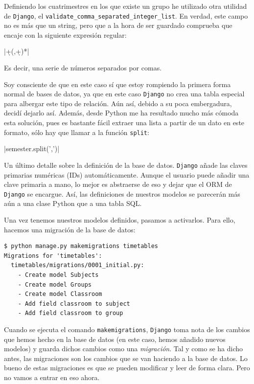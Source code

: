 \begin{enumerate}[---]
Definiendo los cuatrimestres en los que existe un grupo he utilizado otra utilidad de \texttt{Django}, el \texttt{validate\_comma\_separated\_integer\_list}. En verdad, este campo no es más que un string, pero que a la hora de ser guardado comprueba que encaje con la siguiente expresión regular:

|\d+(,\d+)*|

Es decir, una serie de números separados por comas. 

Soy consciente de que en este caso sí que estoy rompiendo la primera forma normal de bases de datos, ya que en este caso \texttt{Django} no crea una tabla especial para albergar este tipo de relación. Aún así, debido a su poca embergadura, decidí dejarlo así. Además, desde Python me ha resultado mucho más cómoda esta solución, pues es bastante fácil extraer una lista a partir de un dato en este formato, sólo hay que llamar a la función \texttt{split}:

|semester.split(',')|

\end{enumerate}

Un último detalle sobre la definición de la base de datos. \texttt{Django} añade las claves primarias numéricas (IDs) automáticamente. Aunque el usuario puede añadir una clave primaria a mano, lo mejor es abstraerse de eso y dejar que el ORM de \texttt{Django} se encargue. Así, las definiciones de nuestros modelos se parecerán más aún a una clase Python que a una tabla SQL.

Una vez tenemos nuestros modelos definidos, pasamos a activarlos. Para ello, hacemos una migración de la base de datos:

\begin{verbatim}
$ python manage.py makemigrations timetables
Migrations for 'timetables':
  timetables/migrations/0001_initial.py:
    - Create model Subjects
    - Create model Groups
    - Create model Classroom
    - Add field classroom to subject
    - Add field classroom to group
\end{verbatim}

Cuando se ejecuta el comando \texttt{makemigrations}, \texttt{Django} toma nota de los cambios que hemos hecho en la base de datos (en este caso, hemos añadido nuevos modelos) y guarda dichos cambios como una \textit{migración}. Tal y como se ha dicho antes, las migraciones son los cambios que se van haciendo a la base de datos. Lo bueno de estas migraciones es que se pueden modificar y leer de forma clara. Pero no vamos a entrar en eso ahora.

